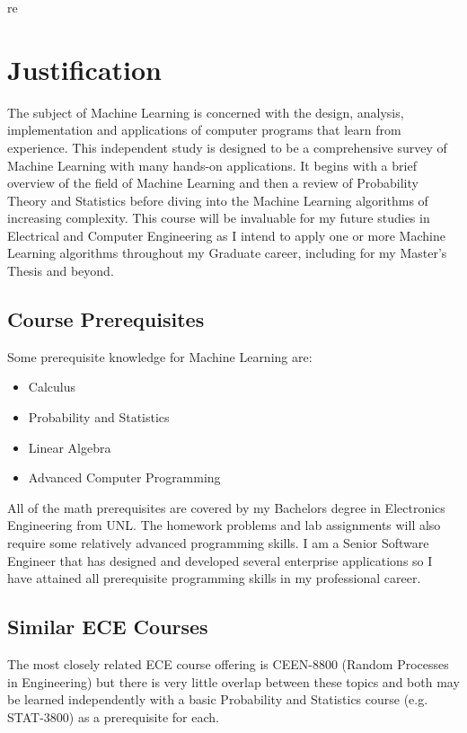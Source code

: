 \documentclass[12pt]{article}
\begin{document}
\newpage
re

\section{Justification}

The subject of Machine Learning is concerned with the design, analysis, implementation
and applications of computer programs that learn from experience. This independent study is designed
to be a comprehensive survey of Machine Learning with many hands-on applications. It begins
with a brief overview of the field of Machine Learning and then a review of Probability
Theory and Statistics before diving into the Machine Learning algorithms of increasing complexity.
This course will be invaluable for my future studies in Electrical and Computer Engineering as
I intend to apply one or more Machine Learning algorithms throughout my Graduate career, including for my
Master's Thesis and beyond. 

\subsection{Course Prerequisites}

Some prerequisite knowledge for Machine Learning are:

\begin{itemize}
\item Calculus
\item Probability and Statistics
\item Linear Algebra
\item Advanced Computer Programming
\end{itemize}

All of the math prerequisites are covered by my Bachelors degree in Electronics Engineering from UNL. The homework
problems and lab assignments will also require some relatively advanced programming skills. I am a Senior Software
Engineer that has designed and developed several enterprise applications so I have attained all prerequisite
programming skills in my professional career.

\subsection{Similar ECE Courses}

The most closely related ECE course offering is CEEN-8800 (Random Processes in Engineering) but there is very little
overlap between these topics and both may be learned independently with a basic Probability and Statistics course
(e.g. STAT-3800) as a prerequisite for each.
\end{document}
